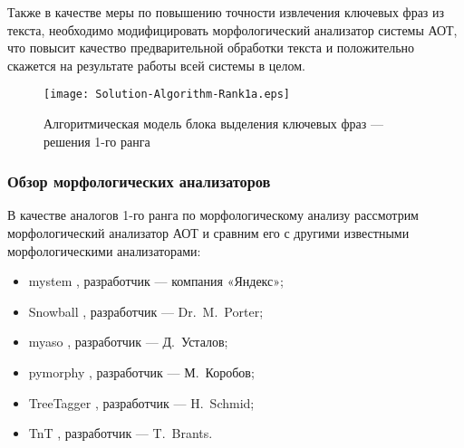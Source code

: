 Также в качестве меры по повышению точности извлечения
ключевых фраз из текста, необходимо модифицировать морфологический
анализатор системы АОТ, что повысит качество предварительной
обработки текста и положительно скажется на результате работы
всей системы в целом.

\begin{figure}[H]
  \centering
  \texttt{[image: Solution-Algorithm-Rank1a.eps]}
  \caption{Алгоритмическая модель блока выделения ключевых фраз —
решения 1-го ранга}
  \label{fig:Solution-Algorithm-Rank1a}
\end{figure}

\subsubsection{Обзор морфологических анализаторов}
В качестве аналогов 1-го ранга по морфологическому анализу
рассмотрим морфологический анализатор АОТ и сравним его с
другими известными \cite{Lyashevskaya10} морфологическими
анализаторами:
\begin{itemize}
  \item mystem \cite{Mystem,Segalovich03}, разработчик —
компания «Яндекс»;
  \item Snowball \cite{Snowball,Porter93}, разработчик —
Dr.~M.~Porter;
  \item myaso \cite{Myaso}, разработчик — Д.~Усталов;
  \item pymorphy \cite{Pymorphy}, разработчик — М.~Коробов;
  \item TreeTagger \cite{TreeTagger,Schmid94}, разработчик —
H.~Schmid;
  \item TnT \cite{TnT,Brants00}, разработчик — T.~Brants.
\end{itemize}

